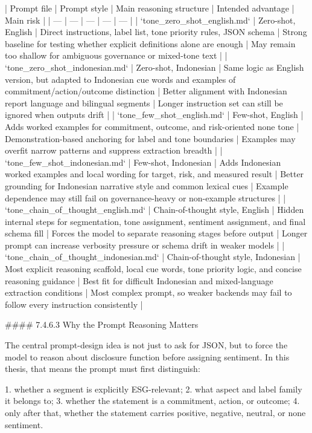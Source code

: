 | Prompt file | Prompt style | Main reasoning structure | Intended advantage | Main risk |
| --- | --- | --- | --- | --- |
| `tone_zero_shot_english.md` | Zero-shot, English | Direct instructions, label list, tone priority rules, JSON schema | Strong baseline for testing whether explicit definitions alone are enough | May remain too shallow for ambiguous governance or mixed-tone text |
| `tone_zero_shot_indonesian.md` | Zero-shot, Indonesian | Same logic as English version, but adapted to Indonesian cue words and examples of commitment/action/outcome distinction | Better alignment with Indonesian report language and bilingual segments | Longer instruction set can still be ignored when outputs drift |
| `tone_few_shot_english.md` | Few-shot, English | Adds worked examples for commitment, outcome, and risk-oriented none tone | Demonstration-based anchoring for label and tone boundaries | Examples may overfit narrow patterns and suppress extraction breadth |
| `tone_few_shot_indonesian.md` | Few-shot, Indonesian | Adds Indonesian worked examples and local wording for target, risk, and measured result | Better grounding for Indonesian narrative style and common lexical cues | Example dependence may still fail on governance-heavy or non-example structures |
| `tone_chain_of_thought_english.md` | Chain-of-thought style, English | Hidden internal steps for segmentation, tone assignment, sentiment assignment, and final schema fill | Forces the model to separate reasoning stages before output | Longer prompt can increase verbosity pressure or schema drift in weaker models |
| `tone_chain_of_thought_indonesian.md` | Chain-of-thought style, Indonesian | Most explicit reasoning scaffold, local cue words, tone priority logic, and concise reasoning guidance | Best fit for difficult Indonesian and mixed-language extraction conditions | Most complex prompt, so weaker backends may fail to follow every instruction consistently |

#### 7.4.6.3 Why the Prompt Reasoning Matters

The central prompt-design idea is not just to ask for JSON, but to force the model to reason about disclosure function before assigning sentiment. In this thesis, that means the prompt must first distinguish:

1. whether a segment is explicitly ESG-relevant;
2. what aspect and label family it belongs to;
3. whether the statement is a commitment, action, or outcome;
4. only after that, whether the statement carries positive, negative, neutral, or none sentiment.

